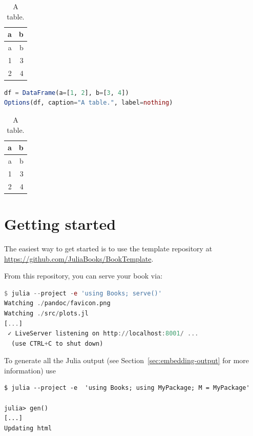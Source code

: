 \documentclass[
  notoc %
]{tufte-book}
\begin{document}
\begin{longtable}[]{@{}rr@{}}
\caption{A table.}\tabularnewline
\toprule
a & b \\
\midrule
\endfirsthead
\toprule
a & b \\
\midrule
\endhead
1 & 3 \\
2 & 4 \\
\bottomrule
\end{longtable}

\begin{lstlisting}[language=Julia]
df = DataFrame(a=[1, 2], b=[3, 4])
Options(df, caption="A table.", label=nothing)
\end{lstlisting}

\begin{longtable}[]{@{}rr@{}}
\caption{A table.}\tabularnewline
\toprule
a & b \\
\midrule
\endfirsthead
\toprule
a & b \\
\midrule
\endhead
1 & 3 \\
2 & 4 \\
\bottomrule
\end{longtable}

\hypertarget{sec:getting-started}{%
\chapter{Getting started}\label{sec:getting-started}}

The easiest way to get started is to use the template repository at
\url{https://github.com/JuliaBooks/BookTemplate}.

From this repository, you can serve your book via:

\begin{lstlisting}[language=Julia]
$ julia --project -e 'using Books; serve()'
Watching ./pandoc/favicon.png
Watching ./src/plots.jl
[...]
 ✓ LiveServer listening on http://localhost:8001/ ...
  (use CTRL+C to shut down)

\end{lstlisting}

To generate all the Julia output (see Section~\ref{sec:embedding-output}
for more information) use

\begin{lstlisting}
$ julia --project -e  'using Books; using MyPackage; M = MyPackage'

julia> gen()
[...]
Updating html
\end{lstlisting}
\end{document}
